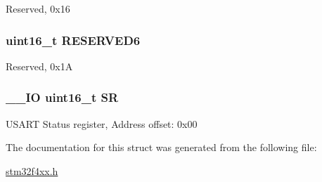 Reserved, 0x16 \hypertarget{struct_u_s_a_r_t___type_def_aab502dde158ab7da8e7823d1f8a06edb}{
\subsubsection[{R\-E\-S\-E\-R\-V\-E\-D6}]{\setlength{\rightskip}{0pt plus 5cm}uint16\-\_\-t R\-E\-S\-E\-R\-V\-E\-D6}}\label{struct_u_s_a_r_t___type_def_aab502dde158ab7da8e7823d1f8a06edb}
Reserved, 0x1\-A \hypertarget{struct_u_s_a_r_t___type_def_a44962ea5442d203bf4954035d1bfeb9d}{
\subsubsection[{S\-R}]{\setlength{\rightskip}{0pt plus 5cm}\-\_\-\-\_\-\-I\-O uint16\-\_\-t S\-R}}\label{struct_u_s_a_r_t___type_def_a44962ea5442d203bf4954035d1bfeb9d}
U\-S\-A\-R\-T Status register, Address offset\-: 0x00 

The documentation for this struct was generated from the following file\-:\begin{DoxyCompactItemize}
\item 
\hyperlink{stm32f4xx_8h}{stm32f4xx.\-h}\end{DoxyCompactItemize}
